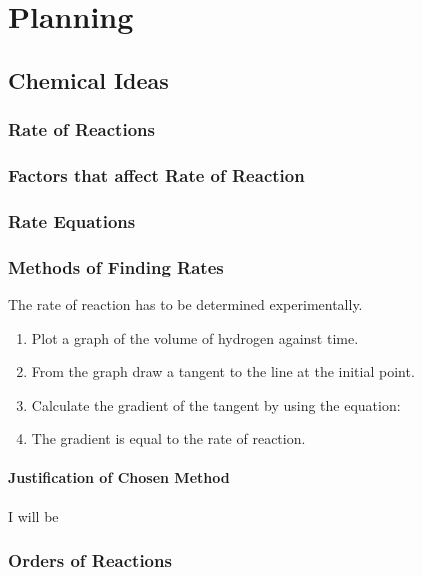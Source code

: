 \chapter {Planning}

\section {Chemical Ideas}


	\subsection{Rate of Reactions}

	\subsection{Factors that affect Rate of Reaction}

	\subsection{Rate Equations}





	\subsection{Methods of Finding Rates}

The rate of reaction has to be determined experimentally. 

\begin{enumerate}
\item Plot a graph of the volume of hydrogen against time.
\item From the graph draw a tangent to the line at the initial point.
\item Calculate the gradient of the tangent by using the equation: 
\item The gradient is equal to the rate of reaction.
\end{enumerate}





		\subsubsection{Justification of Chosen Method}

I will be 


	\subsection{Orders of Reactions}





